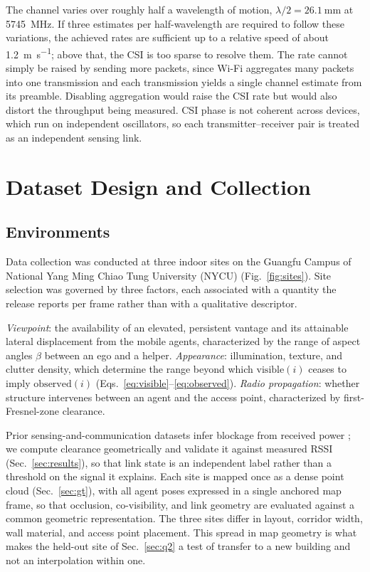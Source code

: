 \documentclass[conference]{IEEEtran}
\begin{document}
The channel varies over roughly half a wavelength of motion,
$\lambda/2 = \SI{26.1}{\milli\metre}$ at \SI{5745}{\mega\hertz}. If
three estimates per half-wavelength are required to follow these
variations, the achieved rates are sufficient up to a relative speed
of about \SI{1.2}{\metre\per\second}; above that, the CSI is too
sparse to resolve them. The rate cannot simply be raised by sending
more packets, since Wi-Fi aggregates many packets into one
transmission and each transmission yields a single channel estimate
from its preamble. Disabling aggregation would raise the CSI rate but
would also distort the throughput being measured. CSI phase is not
coherent across devices, which run on independent oscillators, so
each transmitter--receiver pair is treated as an independent sensing
link.



\section{Dataset Design and Collection}
\label{sec:collection}

\subsection{Environments}
\label{sec:environments}
Data collection was conducted at three indoor sites on the Guangfu
Campus of National Yang Ming Chiao Tung University (NYCU)
(Fig.~\ref{fig:sites}). Site selection was governed by three factors,
each associated with a quantity the release reports per frame rather
than with a qualitative descriptor.

\textit{Viewpoint}: the availability of an elevated, persistent
vantage and its attainable lateral displacement from the mobile
agents, characterized by the range of aspect angles $\beta$ between an
ego and a helper. \textit{Appearance}: illumination, texture, and
clutter density, which determine the range beyond which
$\mathrm{visible}(i)$ ceases to imply $\mathrm{observed}(i)$
(Eqs.~\eqref{eq:visible}--\eqref{eq:observed}). \textit{Radio
propagation}: whether structure intervenes between an agent and the
access point, characterized by first-Fresnel-zone clearance.

Prior sensing-and-communication datasets infer blockage from received
power \cite{deepsense6g}; we compute clearance geometrically and
validate it against measured RSSI (Sec.~\ref{sec:results}), so that
link state is an independent label rather than a threshold on the
signal it explains. Each site is mapped once as a dense point cloud
(Sec.~\ref{sec:gt}), with all agent poses expressed in a single
anchored map frame, so that occlusion, co-visibility, and link
geometry are evaluated against a common geometric representation.
The three sites differ in layout, corridor width, wall material, and
access point placement. This spread in map geometry is what makes the
held-out site of Sec.~\ref{sec:q2} a test of transfer to a new
building and not an interpolation within one.
\end{document}
